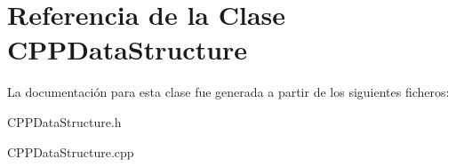 \hypertarget{classCPPDataStructure}{\section{Referencia de la Clase C\-P\-P\-Data\-Structure}
\label{classCPPDataStructure}
}


La documentación para esta clase fue generada a partir de los siguientes ficheros\-:\begin{DoxyCompactItemize}
\item 
C\-P\-P\-Data\-Structure.\-h\item 
C\-P\-P\-Data\-Structure.\-cpp\end{DoxyCompactItemize}

